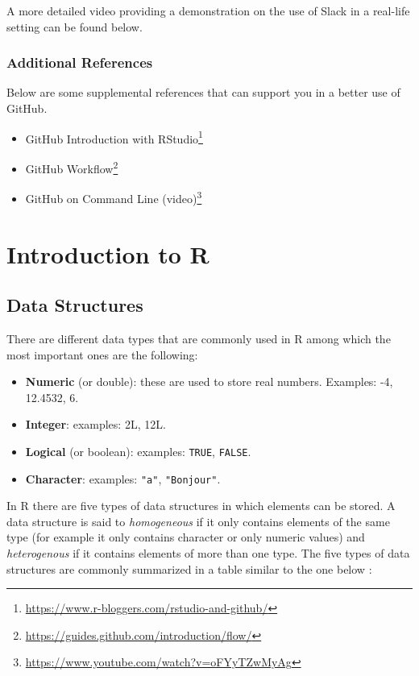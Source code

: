 \documentclass[12pt,]{krantz}
\providecommand{\tightlist}{%
  \setlength{\itemsep}{0pt}\setlength{\parskip}{0pt}}
\renewcommand{\href}[2]{#2\footnote{\url{#1}}}
\begin{document}
A more detailed video providing a demonstration on the use of Slack in a
real-life setting can be found below.

\section{Additional References}\label{additional-references-2}

Below are some supplemental references that can support you in a better
use of GitHub.

\begin{itemize}
\tightlist
\item
  \href{https://www.r-bloggers.com/rstudio-and-github/}{GitHub
  Introduction with RStudio}
\item
  \href{https://guides.github.com/introduction/flow/}{GitHub Workflow}
\item
  \href{https://www.youtube.com/watch?v=oFYyTZwMyAg}{GitHub on Command
  Line (video)}
\end{itemize}

\part{Introduction to R}\label{part-introduction-to-r}

\chapter{Data Structures}\label{data}

There are different data types that are commonly used in R among which
the most important ones are the following:

\begin{itemize}
\item
  \textbf{Numeric} (or double): these are used to store real numbers.
  Examples: -4, 12.4532, 6.
\item
  \textbf{Integer}: examples: 2L, 12L.
\item
  \textbf{Logical} (or boolean): examples: \texttt{TRUE},
  \texttt{FALSE}.
\item
  \textbf{Character}: examples: \texttt{"a"}, \texttt{"Bonjour"}.
\end{itemize}

In R there are five types of data structures in which elements can be
stored. A data structure is said to \emph{homogeneous} if it only
contains elements of the same type (for example it only contains
character or only numeric values) and \emph{heterogenous} if it contains
elements of more than one type. The five types of data structures are
commonly summarized in a table similar to the one below \citep[see
e.g.][]{wickham2014advanced}:
\end{document}
